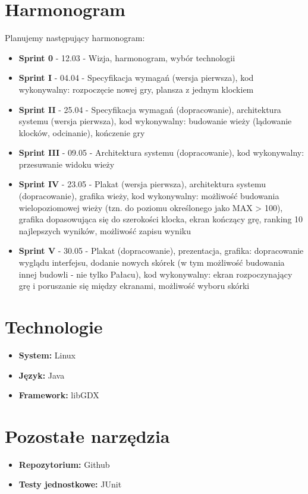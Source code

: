 \documentclass{article}
\begin{document}
\section{Harmonogram}
Planujemy następujący harmonogram:
\begin{itemize}
\item\textbf{Sprint 0} - 12.03 - Wizja, harmonogram, wybór technologii
\item\textbf{Sprint I} - 04.04 - Specyfikacja wymagań (wersja pierwsza), kod wykonywalny: rozpoczęcie nowej gry, plansza z jednym klockiem
\item\textbf{Sprint II} - 25.04 - Specyfikacja wymagań (dopracowanie), architektura systemu (wersja pierwsza), kod wykonywalny: budowanie wieży (lądowanie klocków, odcinanie), kończenie gry
\item\textbf{Sprint III} - 09.05 - Architektura systemu (dopracowanie), kod wykonywalny: przesuwanie widoku wieży
\item\textbf{Sprint IV} - 23.05 - Plakat (wersja pierwsza), architektura systemu (dopracowanie), grafika wieży, kod wykonywalny: możliwość budowania wielopoziomowej wieży (tzn. do poziomu określonego jako MAX > 100), grafika dopasowująca się do szerokości klocka, ekran kończący grę, ranking 10 najlepszych wyników, możliwość zapisu wyniku
\item\textbf{Sprint V} - 30.05 - Plakat (dopracowanie), prezentacja, grafika: dopracowanie wyglądu interfejsu, dodanie nowych skórek (w tym możliwość budowania innej budowli - nie tylko Pałacu), kod wykonywalny:  ekran rozpoczynający grę i poruszanie się między ekranami, możliwość wyboru skórki
\end{itemize}

\section{Technologie}
\begin{itemize}
\item\textbf{System:} Linux
\item\textbf{Język:} Java
\item\textbf{Framework:} libGDX
\end{itemize}


\section{Pozostałe narzędzia}
\begin{itemize}
\item\textbf{Repozytorium:} Github
\item\textbf{Testy jednostkowe:} JUnit
\end{itemize}
\end{document}
